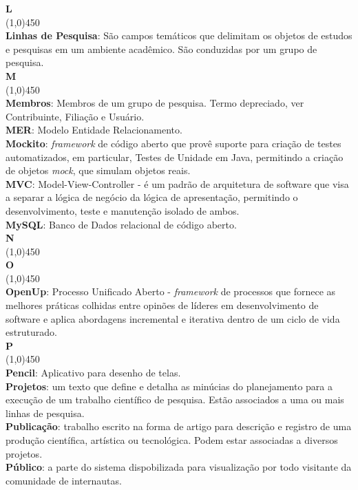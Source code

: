 \documentclass[11pt, a4paper]{article}
\begin{document}
	\noindent\textbf{\huge{L}}\\
	\line(1,0){450}\\
	\textbf{Linhas de Pesquisa}: São campos temáticos que delimitam os objetos de estudos e pesquisas em um ambiente acadêmico.
	São conduzidas por um grupo de pesquisa.\\
		
	\noindent\textbf{\huge{M}}\\
	\line(1,0){450}\\
	\textbf{Membros}: Membros de um grupo de pesquisa. Termo depreciado, ver Contribuinte,
	Filiação e Usuário.\\
	\textbf{MER}: Modelo Entidade Relacionamento.\\
	\textbf{Mockito}: \emph{framework} de código aberto que provê suporte para criação de testes automatizados, em particular, Testes de Unidade em Java, permitindo a criação de objetos \emph{mock}, que simulam objetos reais.\\
	\textbf{MVC}: Model-View-Controller - é um padrão de arquitetura de software
	que visa a separar a lógica de negócio da lógica de apresentação, permitindo
	o desenvolvimento, teste e manutenção isolado de ambos.\\
	\textbf{MySQL}: Banco de Dados relacional de código aberto.\\
			
	\noindent\textbf{\huge{N}}\\
	\line(1,0){450}\\
	
	\noindent\textbf{\huge{O}}\\
	\line(1,0){450}\\
	\textbf{OpenUp}: Processo Unificado Aberto - \emph{framework} de processos que fornece as
	melhores práticas colhidas entre opinões de líderes em desenvolvimento de software e aplica
	abordagens incremental e iterativa dentro de um ciclo de vida estruturado.\\
	
	\noindent\textbf{\huge{P}}\\
	\line(1,0){450}\\
	\textbf{Pencil}: Aplicativo para desenho de telas.\\
	\textbf{Projetos}: um texto que define e detalha as minúcias do planejamento para a execução de
	um trabalho científico de pesquisa. Estão associados a uma ou mais linhas de pesquisa.\\
	\textbf{Publicação}: trabalho escrito na forma de artigo para descrição e registro de uma
	produção científica, artística ou tecnológica. Podem estar associadas a diversos projetos.\\
	\textbf{Público}: a parte do sistema dispobilizada para visualização por todo visitante
	da comunidade de internautas.\\
	
\end{document}
